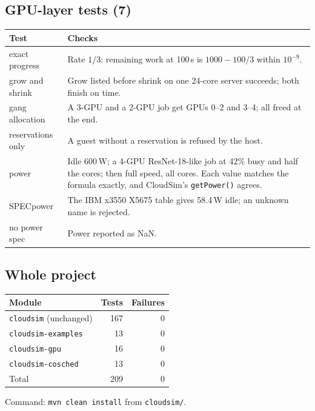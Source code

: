 \documentclass[11pt,a4paper]{article}
\newcommand{\code}[1]{\texttt{#1}}
\begin{document}
\subsection{GPU-layer tests (7)}
\begin{center}
\begin{tabularx}{\linewidth}{@{}lX@{}}
\toprule
Test & Checks \\
\midrule
exact progress & Rate $1/3$: remaining work at 100\,s is $1000 - 100/3$ within $10^{-9}$. \\
grow and shrink & Grow listed before shrink on one 24-core server succeeds; both finish on time. \\
gang allocation & A 3-GPU and a 2-GPU job get GPUs 0--2 and 3--4; all freed at the end. \\
reservations only & A guest without a reservation is refused by the host. \\
power & Idle 600\,W; a 4-GPU ResNet-18-like job at 42\% busy and half the cores; then full speed,
  all cores. Each value matches the formula exactly, and CloudSim's \code{getPower()} agrees. \\
SPECpower & The IBM x3550 X5675 table gives 58.4\,W idle; an unknown name is rejected. \\
no power spec & Power reported as NaN. \\
\bottomrule
\end{tabularx}
\end{center}

\subsection{Whole project}
\begin{center}
\begin{tabular}{@{}lrr@{}}
\toprule
Module & Tests & Failures \\
\midrule
\code{cloudsim} (unchanged) & 167 & 0 \\
\code{cloudsim-examples} & 13 & 0 \\
\code{cloudsim-gpu} & 16 & 0 \\
\code{cloudsim-cosched} & 13 & 0 \\
\midrule
Total & 209 & 0 \\
\bottomrule
\end{tabular}
\end{center}
Command: \code{mvn clean install} from \code{cloudsim/}.

\end{document}
